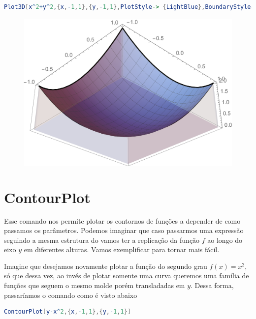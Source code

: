 \documentclass[a4paper, 12pt]{article}
\begin{document}
\begin{itemize}
\begin{lstlisting}[language=Mathematica]
Plot3D[x^2+y^2,{x,-1,1},{y,-1,1},PlotStyle-> {LightBlue},BoundaryStyle->{Thick,Blue},Filling-> Bottom,FillingStyle->{Opacity[.2]}]
\end{lstlisting}

			\begin{figure}[!h]
				\centering
				\includegraphics[scale=.3]{images/PlotStyle3d1}
			\end{figure}
	\end{itemize}

	\section{ContourPlot}
		Esse comando nos permite plotar os contornos de funções a depender de como passamos os parâmetros. Podemos imaginar que caso passarmos uma expressão seguindo a mesma estrutura do  vamos ter a replicação da função $f$ ao longo do eixo $y$ em diferentes alturas. Vamos exemplificar para tornar mais fácil.
		
		Imagine que desejamos novamente plotar a função do segundo grau $f(x)=x^{2}$, só que dessa vez, ao invés de plotar somente uma curva queremos uma família de funções que seguem o mesmo molde porém transladadas em $y$. Dessa forma, passaríamos o comando como é visto abaixo 
		
\begin{lstlisting}[language=Mathematica]
ContourPlot[y-x^2,{x,-1,1},{y,-1,1}]
\end{lstlisting}
\end{document}
